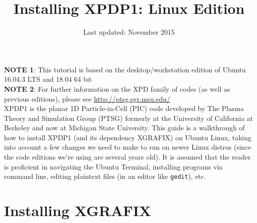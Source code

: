 \documentclass{article}
\title{Installing XPDP1: Linux Edition}
\author{}
\date{Last updated: November 2015}
\begin{document}
	\maketitle
	
	\noindent \textbf{NOTE 1}: This tutorial is based on the desktop/workstation edition of Ubuntu 16.04.3 LTS and 18.04 64 bit \\
	\textbf{NOTE 2}: For further information on the XPD family of codes (as well as previous editions), please see \url{http://ptsg.egr.msu.edu/} \\
	
	\noindent XPDP1 is the planar 1D Particle-in-Cell (PIC) code developed by The Plasma Theory and Simulation Group (PTSG) formerly at the University of California at Berkeley and now at Michigan State University. This guide is a walkthrough of how to install XPDP1 (and its dependency XGRAFIX) on Ubuntu Linux, taking into account a few changes we need to make to run on newer Linux distros (since the code editions we're using are several years old). It is assumed that the reader is proficient in navigating the Ubuntu Terminal, installing programs via command line, editing plaintext files (in an editor like \verb|gedit|), etc.
	
	\section{Installing XGRAFIX}
	
\end{document}
